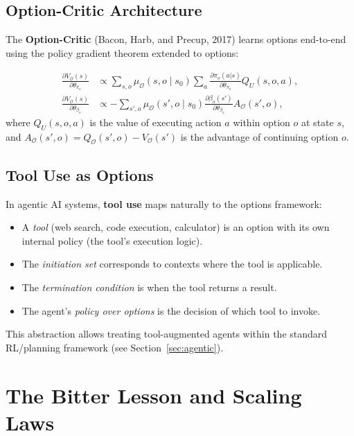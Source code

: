 \documentclass[11pt,a4paper]{article}
\newcommand{\cO}{\mathcal{O}}
\begin{document}
\subsection{Option-Critic Architecture}

The \textbf{Option-Critic} (Bacon, Harb, and Precup, 2017) learns options
end-to-end using the policy gradient theorem extended to options:

\begin{align}
  \frac{\partial V_\cO(s)}{\partial \theta_{\pi_o}} &\propto \sum_{s,o} \mu_\cO(s, o \mid s_0)
  \sum_a \frac{\partial \pi_{o}(a|s)}{\partial \theta_{\pi_o}} Q_U(s, o, a), \\
  \frac{\partial V_\cO(s)}{\partial \theta_{\beta_o}} &\propto -\sum_{s',o} \mu_\cO(s', o \mid s_0)
  \frac{\partial \beta_o(s')}{\partial \theta_{\beta_o}} A_\cO(s', o),
\end{align}
where $Q_U(s, o, a)$ is the value of executing action $a$ within option $o$ at state $s$,
and $A_\cO(s', o) = Q_\cO(s', o) - V_\cO(s')$ is the advantage of continuing option $o$.

\subsection{Tool Use as Options}

In agentic AI systems, \textbf{tool use} maps naturally to the options framework:
\begin{itemize}[nosep]
  \item A \emph{tool} (web search, code execution, calculator) is an option with
    its own internal policy (the tool's execution logic).
  \item The \emph{initiation set} corresponds to contexts where the tool is applicable.
  \item The \emph{termination condition} is when the tool returns a result.
  \item The agent's \emph{policy over options} is the decision of which tool to invoke.
\end{itemize}
This abstraction allows treating tool-augmented agents within the standard
RL/planning framework (see Section~\ref{sec:agentic}).


\section{The Bitter Lesson and Scaling Laws}
\label{sec:bitter}
\end{document}
